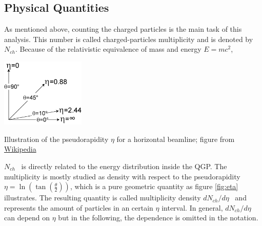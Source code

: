 \documentclass{article}
\newcommand\Nch{$N_{ch}$}
\newcommand\dNdEta{$dN_{ch}/d\eta$}
\begin{document}
\subsection{Physical Quantities}
As mentioned above, counting the charged particles is the main task of this analysis. This number is called charged-particles multiplicity and is denoted by \Nch. Because of the relativistic equivalence of mass and energy $E=m c^2$,
\begin{floatingfigure}[r]{60mm}
\centering
\includegraphics[width=40mm, natwidth=270, natheight=220]{images/Pseudorapidity.png}
\caption{Illustration of the pseudorapidity $\eta$ for a horizontal beamline; figure from \href{https://en.wikipedia.org/wiki/Pseudorapidity}{Wikipedia}}
\label{fig:eta}
\end{floatingfigure}
\noindent \Nch~ is directly related to the energy distribution inside the QGP. The multiplicity is mostly studied as density with respect to the pseudorapidity $\eta = \ln(\tan(\frac{\theta}{2}))$, which is a pure geometric quantity as figure \ref{fig:eta} illustrates. The resulting quantity is called multiplicity density \dNdEta~ and represents the amount of particles in an certain $\eta$ interval. In general, \dNdEta~ can depend on $\eta$ but in the following, the dependence is omitted in the notation.\\
\end{document}
